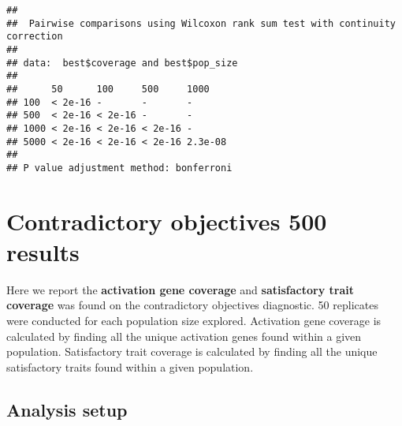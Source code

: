 \documentclass[
]{book}
\newenvironment{Shaded}{\begin{snugshade}}{\end{snugshade}}
\newcommand{\AttributeTok}[1]{\textcolor[rgb]{0.13,0.29,0.53}{#1}}
\newcommand{\CommentTok}[1]{\textcolor[rgb]{0.56,0.35,0.01}{\textit{#1}}}
\newcommand{\ConstantTok}[1]{\textcolor[rgb]{0.56,0.35,0.01}{#1}}
\newcommand{\FunctionTok}[1]{\textcolor[rgb]{0.13,0.29,0.53}{\textbf{#1}}}
\newcommand{\NormalTok}[1]{#1}
\newcommand{\OtherTok}[1]{\textcolor[rgb]{0.56,0.35,0.01}{#1}}
\newcommand{\SpecialCharTok}[1]{\textcolor[rgb]{0.81,0.36,0.00}{\textbf{#1}}}
\newcommand{\StringTok}[1]{\textcolor[rgb]{0.31,0.60,0.02}{#1}}
\begin{document}
\begin{verbatim}
## 
##  Pairwise comparisons using Wilcoxon rank sum test with continuity correction 
## 
## data:  best$coverage and best$pop_size 
## 
##      50      100     500     1000   
## 100  < 2e-16 -       -       -      
## 500  < 2e-16 < 2e-16 -       -      
## 1000 < 2e-16 < 2e-16 < 2e-16 -      
## 5000 < 2e-16 < 2e-16 < 2e-16 2.3e-08
## 
## P value adjustment method: bonferroni
\end{verbatim}

\hypertarget{contradictory-objectives-500-results}{%
\chapter{Contradictory objectives 500 results}\label{contradictory-objectives-500-results}}

Here we report the \textbf{activation gene coverage} and \textbf{satisfactory trait coverage} was found on the contradictory objectives diagnostic.
50 replicates were conducted for each population size explored.
Activation gene coverage is calculated by finding all the unique activation genes found within a given population.
Satisfactory trait coverage is calculated by finding all the unique satisfactory traits found within a given population.

\hypertarget{analysis-setup-5}{%
\section{Analysis setup}\label{analysis-setup-5}}

\begin{Shaded}
\end{Shaded}
\end{document}
